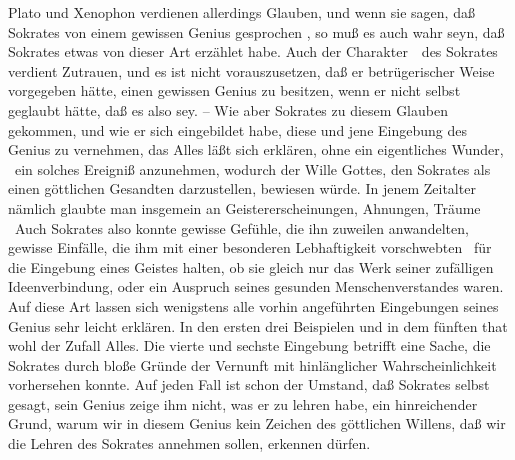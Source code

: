 \begin{aufza}
\item Plato und Xenophon verdienen allerdings Glauben, und wenn sie sagen, daß Sokrates von einem gewissen Genius gesprochen \usw , so muß es auch wahr seyn, daß Sokrates etwas von dieser Art erzählet habe. Auch der Charakter~\ des Sokrates verdient Zutrauen, und es ist nicht vorauszusetzen, daß er betrügerischer Weise vorgegeben hätte, einen gewissen Genius zu besitzen, wenn er nicht selbst geglaubt hätte, daß es also sey. -- Wie aber Sokrates zu diesem Glauben gekommen, und wie er sich eingebildet habe, diese und jene Eingebung des Genius zu vernehmen, das Alles läßt sich erklären, ohne ein eigentliches Wunder, \dh\ ein solches Ereigniß anzunehmen, wodurch der Wille Gottes, den Sokrates als einen göttlichen Gesandten darzustellen, bewiesen würde. In jenem Zeitalter nämlich glaubte man insgemein an Geistererscheinungen, Ahnungen, Träume \udgl\  Auch Sokrates also konnte gewisse Gefühle, die ihn zuweilen anwandelten, gewisse Einfälle, die ihm mit einer besonderen Lebhaftigkeit vorschwebten \udgl\  für die Eingebung eines Geistes halten, ob sie gleich nur das Werk seiner zufälligen Ideenverbindung, oder ein Auspruch seines gesunden Menschenverstandes waren. Auf diese Art lassen sich wenigstens alle vorhin angeführten Eingebungen seines Genius sehr leicht erklären. In den ersten drei Beispielen und in dem fünften that wohl der Zufall Alles. Die vierte und sechste Eingebung betrifft eine Sache, die Sokrates durch bloße Gründe der Vernunft mit hinlänglicher Wahrscheinlichkeit vorhersehen konnte. Auf jeden Fall ist schon der Umstand, daß Sokrates selbst gesagt, sein Genius zeige ihm nicht, was er zu lehren habe, ein hinreichender Grund, warum wir in diesem Genius kein Zeichen des göttlichen Willens, daß wir die Lehren des Sokrates annehmen sollen, erkennen dürfen.
\end{aufza}

